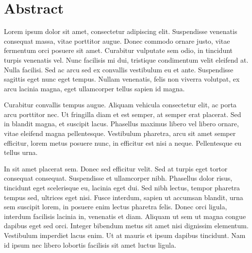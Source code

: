 \chapter*{Abstract}

   Lorem ipsum dolor sit amet, consectetur adipiscing elit. Suspendisse venenatis consequat massa, vitae porttitor augue. Donec commodo ornare justo, vitae fermentum orci posuere sit amet. Curabitur vulputate sem odio, in tincidunt turpis venenatis vel. Nunc facilisis mi dui, tristique condimentum velit eleifend at. Nulla facilisi. Sed ac arcu sed ex convallis vestibulum eu et ante. Suspendisse sagittis eget nunc eget tempus. Nullam venenatis, felis non viverra volutpat, ex arcu lacinia magna, eget ullamcorper tellus sapien id magna.

Curabitur convallis tempus augue. Aliquam vehicula consectetur elit, ac porta arcu porttitor nec. Ut fringilla diam et est semper, at semper erat placerat. Sed in blandit magna, et suscipit lacus. Phasellus maximus libero vel libero ornare, vitae eleifend magna pellentesque. Vestibulum pharetra, arcu sit amet semper efficitur, lorem metus posuere nunc, in efficitur est nisi a neque. Pellentesque eu tellus urna.

In sit amet placerat sem. Donec sed efficitur velit. Sed at turpis eget tortor consequat consequat. Suspendisse et ullamcorper nibh. Phasellus dolor risus, tincidunt eget scelerisque eu, lacinia eget dui. Sed nibh lectus, tempor pharetra tempus sed, ultrices eget nisi. Fusce interdum, sapien ut accumsan blandit, urna sem suscipit lorem, in posuere enim lectus pharetra felis. Donec orci ligula, interdum facilisis lacinia in, venenatis et diam. Aliquam ut sem ut magna congue dapibus eget sed orci. Integer bibendum metus sit amet nisi dignissim elementum. Vestibulum imperdiet lacus enim. Ut at mauris et ipsum dapibus tincidunt. Nam id ipsum nec libero lobortis facilisis sit amet luctus ligula.